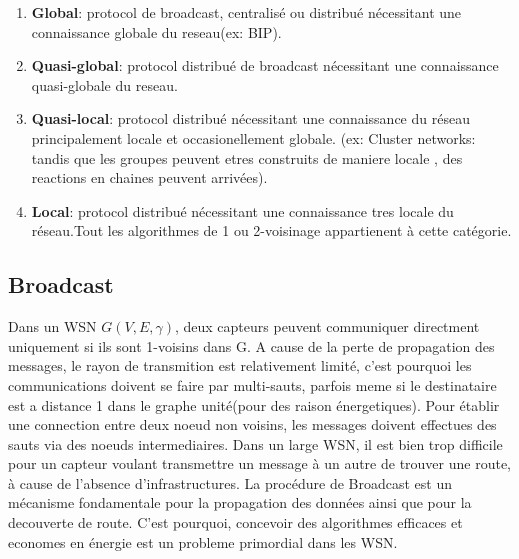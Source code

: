 \begin{enumerate}
 \item \textbf{Global}:         protocol de broadcast, centralisé ou distribué nécessitant une connaissance globale du reseau(ex: BIP).
 \item \textbf{Quasi-global}:   protocol distribué de broadcast nécessitant une connaissance quasi-globale du reseau.
 \item \textbf{Quasi-local}:    protocol distribué nécessitant une connaissance du réseau principalement locale et occasionellement globale.
(ex: Cluster networks: tandis que les groupes peuvent etres construits de maniere locale , des reactions en chaines peuvent arrivées).
 \item \textbf{Local}: 		protocol distribué nécessitant une connaissance tres locale du réseau.Tout les algorithmes de 1 ou 2-voisinage appartienent à cette catégorie.
\end{enumerate}


\subsection{Broadcast}

Dans un WSN $G(V,E,\gamma)$, deux capteurs peuvent communiquer directment uniquement si ils sont 1-voisins dans G.
A cause de la perte de propagation des messages, le rayon de transmition est relativement limité, c'est pourquoi les communications doivent se faire par multi-sauts, parfois meme si le destinataire est a distance 1 dans le graphe 
unité(pour des raison énergetiques). Pour établir une connection entre deux noeud non voisins, les messages doivent effectues des sauts via des noeuds intermediaires. Dans un large WSN, il est bien trop difficile pour un capteur voulant
transmettre un message à un autre de trouver une route, à cause de l'absence d'infrastructures. 
La procédure de Broadcast est un mécanisme fondamentale pour la propagation des données ainsi que pour la decouverte de route. C'est pourquoi, concevoir des algorithmes efficaces et economes en énergie est un probleme primordial 
dans les WSN. 




